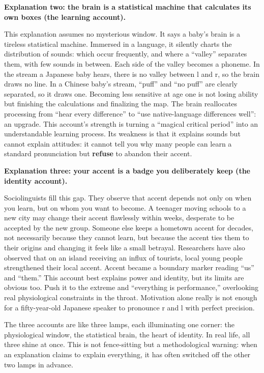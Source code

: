 \textbf{Explanation two: the brain is a statistical machine that calculates its own boxes (the learning account).}

This explanation assumes no mysterious window. It says a baby's brain is a tireless statistical machine. Immersed in a language, it silently charts the distribution of sounds: which occur frequently, and where a ``valley'' separates them, with few sounds in between. Each side of the valley becomes a phoneme. In the stream a Japanese baby hears, there is no valley between l and r, so the brain draws no line. In a Chinese baby's stream, ``puff'' and ``no puff'' are clearly separated, so it draws one. Becoming less sensitive at age one is not losing ability but finishing the calculations and finalizing the map. The brain reallocates processing from ``hear every difference'' to ``use native-language differences well'': an upgrade. This account's strength is turning a ``magical critical period'' into an understandable learning process. Its weakness is that it explains sounds but cannot explain attitudes: it cannot tell you why many people can learn a standard pronunciation but \textbf{refuse} to abandon their accent.

\textbf{Explanation three: your accent is a badge you deliberately keep (the identity account).}

Sociolinguists fill this gap. They observe that accent depends not only on when you learn, but on whom you want to become. A teenager moving schools to a new city may change their accent flawlessly within weeks, desperate to be accepted by the new group. Someone else keeps a hometown accent for decades, not necessarily because they cannot learn, but because the accent ties them to their origins and changing it feels like a small betrayal. Researchers have also observed that on an island receiving an influx of tourists, local young people strengthened their local accent. Accent became a boundary marker reading ``us'' and ``them.'' This account best explains power and identity, but its limits are obvious too. Push it to the extreme and ``everything is performance,'' overlooking real physiological constraints in the throat. Motivation alone really is not enough for a fifty-year-old Japanese speaker to pronounce r and l with perfect precision.

The three accounts are like three lamps, each illuminating one corner: the physiological window, the statistical brain, the heart of identity. In real life, all three shine at once. This is not fence-sitting but a methodological warning: when an explanation claims to explain everything, it has often switched off the other two lamps in advance.

